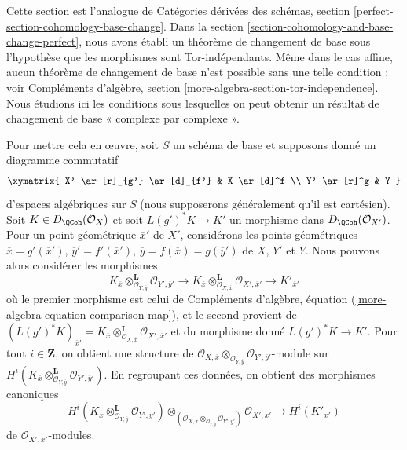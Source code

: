 \noindent
Cette section est l'analogue de Catégories dérivées des schémas, section
\ref{perfect-section-cohomology-base-change}. Dans la
section \ref{section-cohomology-and-base-change-perfect},
nous avons établi un théorème de changement de base sous l'hypothèse que les
morphismes sont Tor-indépendants. Même dans le cas affine, aucun théorème de
changement de base n'est possible sans une telle condition ; voir
Compléments d'algèbre, section \ref{more-algebra-section-tor-independence}.
Nous étudions ici les conditions sous lesquelles on peut obtenir un résultat
de changement de base « complexe par complexe ».

\medskip\noindent
Pour mettre cela en œuvre, soit $S$ un schéma de base et
supposons donné un diagramme commutatif
$$
\xymatrix{
X' \ar[r]_{g'} \ar[d]_{f'} &
X \ar[d]^f \\
Y' \ar[r]^g &
Y
}
$$
d'espaces algébriques sur $S$ (nous supposerons généralement qu'il est cartésien).
Soit $K \in D_\QCoh(\mathcal{O}_X)$
et soit $L(g')^*K \to K'$ un morphisme dans $D_\QCoh(\mathcal{O}_{X'})$.
Pour un point géométrique $\overline{x}'$ de $X'$, considérons les points
géométriques
$\overline{x} = g'(\overline{x}')$,
$\overline{y}' = f'(\overline{x}')$,
$\overline{y} = f(\overline{x}) = g(\overline{y}')$
de $X$, $Y'$ et $Y$.
Nous pouvons alors considérer les morphismes
$$
K_{\overline{x}}
\otimes_{\mathcal{O}_{Y, \overline{y}}}^\mathbf{L}
\mathcal{O}_{Y', \overline{y}'}
\to
K_{\overline{x}}
\otimes_{\mathcal{O}_{X, \overline{x}}}^\mathbf{L}
\mathcal{O}_{X', \overline{x}'} \to
K'_{\overline{x}'}
$$
où le premier morphisme est celui de Compléments d'algèbre,
équation (\ref{more-algebra-equation-comparison-map}),
et le second provient de
$(L(g')^*K)_{\overline{x}'} =
K_{\overline{x}} \otimes_{\mathcal{O}_{X, \overline{x}}}^\mathbf{L}
\mathcal{O}_{X', \overline{x}'}$
et du morphisme donné $L(g')^*K \to K'$.
Pour tout $i \in \mathbf{Z}$, on obtient une structure de
$\mathcal{O}_{X, \overline{x}} \otimes_{\mathcal{O}_{Y, \overline{y}}}
\mathcal{O}_{Y', \overline{y}'}$-module sur
$H^i(K_{\overline{x}}
\otimes_{\mathcal{O}_{Y, \overline{y}}}^\mathbf{L}
\mathcal{O}_{Y', \overline{y}'})$.
En regroupant ces données, on obtient des morphismes canoniques
\begin{equation}
\label{equation-bc}
H^i(K_{\overline{x}}
\otimes_{\mathcal{O}_{Y, \overline{y}}}^\mathbf{L}
\mathcal{O}_{Y', \overline{y}'})
\otimes_{(\mathcal{O}_{X, \overline{x}}
\otimes_{\mathcal{O}_{Y, \overline{y}}}
\mathcal{O}_{Y', \overline{y}'})}
\mathcal{O}_{X', \overline{x}'}
\longrightarrow
H^i(K'_{\overline{x}'})
\end{equation}
de $\mathcal{O}_{X', \overline{x}'}$-modules.

